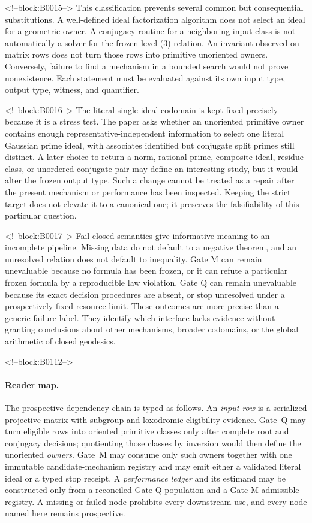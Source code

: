 \documentclass[11pt,a4paper]{article}
\begin{document}
<!--block:B0015-->
This classification prevents several common but consequential substitutions. A well-defined ideal factorization algorithm does not select an ideal for a geometric owner. A conjugacy routine for a neighboring input class is not automatically a solver for the frozen level-(3) relation. An invariant observed on matrix rows does not turn those rows into primitive unoriented owners. Conversely, failure to find a mechanism in a bounded search would not prove nonexistence. Each statement must be evaluated against its own input type, output type, witness, and quantifier.

<!--block:B0016-->
The literal single-ideal codomain is kept fixed precisely because it is a stress test. The paper asks whether an unoriented primitive owner contains enough representative-independent information to select one literal Gaussian prime ideal, with associates identified but conjugate split primes still distinct. A later choice to return a norm, rational prime, composite ideal, residue class, or unordered conjugate pair may define an interesting study, but it would alter the frozen output type. Such a change cannot be treated as a repair after the present mechanism or performance has been inspected. Keeping the strict target does not elevate it to a canonical one; it preserves the falsifiability of this particular question.

<!--block:B0017-->
Fail-closed semantics give informative meaning to an incomplete pipeline. Missing data do not default to a negative theorem, and an unresolved relation does not default to inequality. Gate M can remain unevaluable because no formula has been frozen, or it can refute a particular frozen formula by a reproducible law violation. Gate Q can remain unevaluable because its exact decision procedures are absent, or stop unresolved under a prospectively fixed resource limit. These outcomes are more precise than a generic failure label. They identify which interface lacks evidence without granting conclusions about other mechanisms, broader codomains, or the global arithmetic of closed geodesics.

<!--block:B0112-->
\paragraph{Reader map.} The prospective dependency chain is typed as follows. An \emph{input row} is a serialized projective matrix with subgroup and loxodromic-eligibility evidence. Gate~Q may turn eligible rows into oriented primitive classes only after complete root and conjugacy decisions; quotienting those classes by inversion would then define the unoriented \emph{owners}. Gate~M may consume only such owners together with one immutable candidate-mechanism registry and may emit either a validated literal ideal or a typed stop receipt. A \emph{performance ledger} and its estimand may be constructed only from a reconciled Gate-Q population and a Gate-M-admissible registry. A missing or failed node prohibits every downstream use, and every node named here remains prospective.
\end{document}
